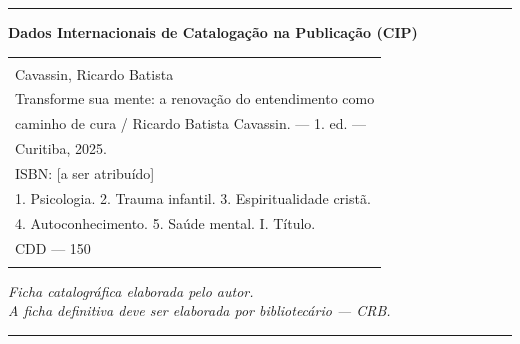 \thispagestyle{empty}
\vspace*{\fill}

\noindent\rule{\textwidth}{0.4pt}

\begin{center}
\small\textbf{Dados Internacionais de Catalogação na Publicação (CIP)}
\end{center}

\begin{center}
\small
\begin{tabular}{|p{}|}
\hline
\\
\hspace{1cm}Cavassin, Ricardo Batista\\[6pt]
\hspace{1.5cm}Transforme sua mente: a renovação do entendimento como\\
\hspace{1cm}caminho de cura / Ricardo Batista Cavassin. --- 1. ed. ---\\
\hspace{1cm}Curitiba, 2025.\\[6pt]
\hspace{1.5cm}ISBN: [a ser atribuído]\\[6pt]
\hspace{1.5cm}1. Psicologia. 2. Trauma infantil. 3. Espiritualidade cristã.\\
\hspace{1cm}4. Autoconhecimento. 5. Saúde mental. I. Título.\\[6pt]
\hspace{6cm}CDD --- 150\\[6pt]
\\
\hline
\end{tabular}
\end{center}

\vspace{1cm}

\begin{center}
\small\textit{Ficha catalográfica elaborada pelo autor.\\
A ficha definitiva deve ser elaborada por bibliotecário --- CRB.}
\end{center}

\noindent\rule{\textwidth}{0.4pt}

\clearpage
